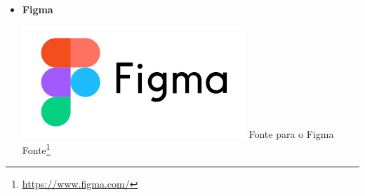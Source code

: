 \documentclass[12pt, openany, oneside, a4paper, english, brazil]{abntex2}   %
\begin{document}
\begin{itemize}
    \item \textbf{Figma}
    \begin{center}
    \includegraphics[width=0.5\linewidth]{figuras/Tecnologies/Figma.png}
    \label{fig:Figma}
    Fonte para o Figma Fonte\footnote{\url{https://www.figma.com/}}
    \end{center}

   
\end{itemize}
\end{document}
